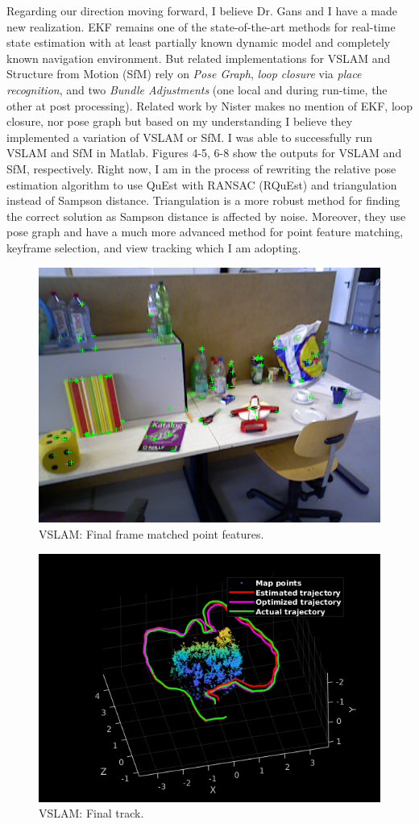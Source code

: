 \documentclass[11pt]{article}
\begin{document}
\begin{itemize}
    Regarding our direction moving forward, I believe Dr. Gans and I have a
    made new realization. EKF remains one of the state-of-the-art
    methods for real-time state estimation with at least partially known
    dynamic model and completely known navigation environment. But related
    implementations for VSLAM and Structure from Motion (SfM) rely on \emph{Pose Graph},
    \emph{loop closure} via \emph{place recognition}, and two \emph{Bundle Adjustments}
    (one local and during run-time, the other at post processing).
    Related work by Nister \cite{nister2004efficient} makes no mention of
    EKF, loop closure, nor pose graph but based on my understanding I believe
    they implemented a variation of VSLAM or SfM. I was able to successfully run
    VSLAM and SfM in Matlab. Figures 4-5, 6-8
    show the outputs for VSLAM and SfM, respectively. Right now, I am in the
    process of rewriting the relative pose estimation algorithm to use QuEst
    with RANSAC (RQuEst) and triangulation instead of Sampson distance.
    Triangulation is a more robust method for finding the correct solution as
    Sampson distance is affected by noise. Moreover, they use pose graph and
    have a much more advanced method for point feature matching,
    keyframe selection, and view tracking which I am adopting.


    \begin{figure}[H]
      \begin{center}
        \includegraphics[width=.6\linewidth]{VSLAM_pFeats.png}
      \end{center}
      \caption{VSLAM: Final frame matched point features.}
    \end{figure}

    \begin{figure}[H]
      \begin{center}
        \includegraphics[width=.6\linewidth]{VSLAM_track.png}
      \end{center}
      \caption{VSLAM: Final track.}
    \end{figure}



\end{itemize}
\end{document}
